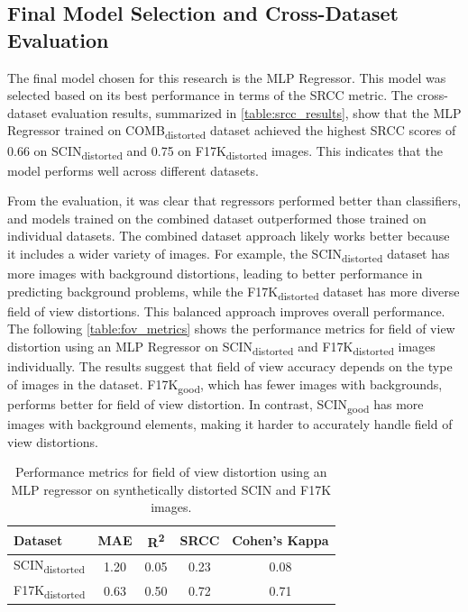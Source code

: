 \subsection{Final Model Selection and Cross-Dataset Evaluation}
\label{sub:1}
The final model chosen for this research is the MLP Regressor. This model was selected based on its best performance in terms of the SRCC metric. The cross-dataset evaluation results, summarized in \autoref{table:srcc_results}, show that the MLP Regressor trained on COMB\textsubscript{distorted} dataset achieved the highest SRCC scores of 0.66 on SCIN\textsubscript{distorted} and 0.75 on F17K\textsubscript{distorted} images. This indicates that the model performs well across different datasets. \par
\vspace{\baselineskip}
\noindent
From the evaluation, it was clear that regressors performed better than classifiers, and models trained on the combined dataset outperformed those trained on individual datasets. The combined dataset approach likely works better because it includes a wider variety of images. For example, the SCIN\textsubscript{distorted} dataset has more images with background distortions, leading to better performance in predicting background problems, while the F17K\textsubscript{distorted} dataset has more diverse field of view distortions. This balanced approach improves overall performance. The following \autoref{table:fov_metrics} shows the performance metrics for field of view distortion using an MLP Regressor on SCIN\textsubscript{distorted} and F17K\textsubscript{distorted} images individually. The results suggest that field of view accuracy depends on the type of images in the dataset. F17K\textsubscript{good}, which has fewer images with backgrounds, performs better for field of view distortion. In contrast, SCIN\textsubscript{good} has more images with background elements, making it harder to accurately handle field of view distortions. \par
\clearpage
\begin{table}[ht]
    \centering
    \begin{tabular}{|l|c|c|c|c|}
        \hline
        \textbf{Dataset} & \textbf{MAE} & \textbf{R\textsuperscript{2}} & \textbf{SRCC} & \textbf{Cohen's Kappa} \\
        \hline
        SCIN\textsubscript{distorted} & 1.20 & 0.05 & 0.23 & 0.08 \\
        F17K\textsubscript{distorted} & 0.63 & 0.50 & 0.72 & 0.71 \\
        \hline
    \end{tabular}
    \caption{Performance metrics for field of view distortion using an MLP regressor on synthetically distorted SCIN and F17K images.}
    \label{table:fov_metrics}
\end{table}

